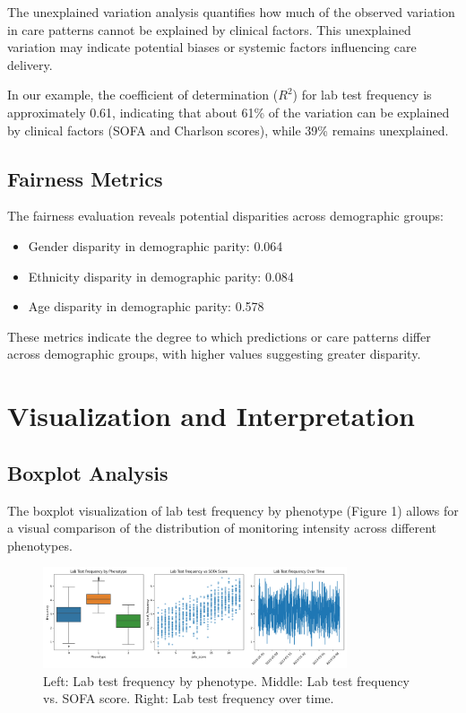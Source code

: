 \documentclass[12pt]{article}
\begin{document}
The unexplained variation analysis quantifies how much of the observed variation in care patterns cannot be explained by clinical factors. This unexplained variation may indicate potential biases or systemic factors influencing care delivery.

In our example, the coefficient of determination ($R^2$) for lab test frequency is approximately 0.61, indicating that about 61\% of the variation can be explained by clinical factors (SOFA and Charlson scores), while 39\% remains unexplained.

\subsection{Fairness Metrics}

The fairness evaluation reveals potential disparities across demographic groups:

\begin{itemize}
    \item Gender disparity in demographic parity: 0.064
    \item Ethnicity disparity in demographic parity: 0.084
    \item Age disparity in demographic parity: 0.578
\end{itemize}

These metrics indicate the degree to which predictions or care patterns differ across demographic groups, with higher values suggesting greater disparity.

\section{Visualization and Interpretation}

\subsection{Boxplot Analysis}

The boxplot visualization of lab test frequency by phenotype (Figure 1) allows for a visual comparison of the distribution of monitoring intensity across different phenotypes.

\begin{figure}[h]
\centering
\includegraphics[width=0.8\textwidth]{../lab_test_analysis.png}
\caption{Left: Lab test frequency by phenotype. Middle: Lab test frequency vs. SOFA score. Right: Lab test frequency over time.}
\end{figure}
\end{document}
